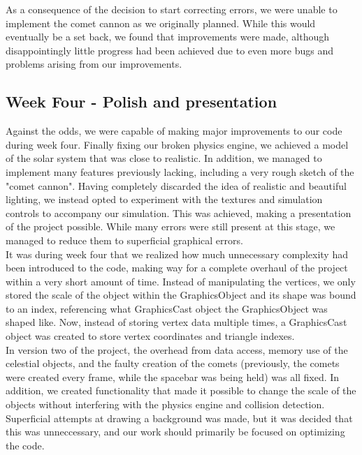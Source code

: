 As a consequence of the decision to start correcting errors, we were unable to implement the comet cannon as we originally planned. While this would eventually be a set back, we found that improvements were made, although disappointingly little progress had been achieved due to even more bugs and problems arising from our improvements.

\subsection{Week Four - Polish and presentation}
Against the odds, we were capable of making major improvements to our code during week four. Finally fixing our broken physics engine, we achieved a model of the solar system that was close to realistic. In addition, we managed to implement many features previously lacking, including a very rough sketch of the "comet cannon". Having completely discarded the idea of realistic and beautiful lighting, we instead opted to experiment with the textures and simulation controls to accompany our simulation. This was achieved, making a presentation of the project possible. While many errors were still present at this stage, we managed to reduce them to superficial graphical errors.\\

It was during week four that we realized how much unnecessary complexity had been introduced to the code, making way for a complete overhaul of the project within a very short amount of time. Instead of manipulating the vertices, we only stored the scale of the object within the GraphicsObject and its shape was bound to an index, referencing what GraphicsCast object the GraphicsObject was shaped like. Now, instead of storing vertex data multiple times, a GraphicsCast object was created to store vertex coordinates and triangle indexes.\\

In version two of the project, the overhead from data access, memory use of the celestial objects, and the faulty creation of the comets (previously, the comets were created every frame, while the spacebar was being held) was all fixed. In addition, we created functionality that made it possible to change the scale of the objects without interfering with the physics engine and collision detection. Superficial attempts at drawing a background was made, but it was decided that this was unneccessary, and our work should primarily be focused on optimizing the code.


\textsl{}